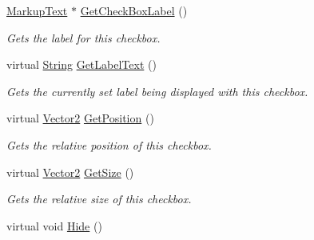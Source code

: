 \begin{DoxyCompactItemize}
\hyperlink{classphys_1_1UI_1_1MarkupText}{MarkupText} $\ast$ \hyperlink{classphys_1_1UI_1_1CheckBox_a5f37379e69ef1259ab48c37a8dc200e9}{GetCheckBoxLabel} ()
\begin{DoxyCompactList}\small\item\em Gets the label for this checkbox. \item\end{DoxyCompactList}\item 
virtual \hyperlink{namespacephys_aa03900411993de7fbfec4789bc1d392e}{String} \hyperlink{classphys_1_1UI_1_1CheckBox_a19078efa52e8b2c133f3b5229b8742eb}{GetLabelText} ()
\begin{DoxyCompactList}\small\item\em Gets the currently set label being displayed with this checkbox. \item\end{DoxyCompactList}\item 
virtual \hyperlink{classphys_1_1Vector2}{Vector2} \hyperlink{classphys_1_1UI_1_1CheckBox_a8a8630b27ab769b6e42657c5388ec7fe}{GetPosition} ()
\begin{DoxyCompactList}\small\item\em Gets the relative position of this checkbox. \item\end{DoxyCompactList}\item 
virtual \hyperlink{classphys_1_1Vector2}{Vector2} \hyperlink{classphys_1_1UI_1_1CheckBox_a99c6ab5087522fbd4825032b9a058585}{GetSize} ()
\begin{DoxyCompactList}\small\item\em Gets the relative size of this checkbox. \item\end{DoxyCompactList}\item 
\hypertarget{classphys_1_1UI_1_1CheckBox_ad58dd6a164e3a3b394899955b612659e}{
virtual void \hyperlink{classphys_1_1UI_1_1CheckBox_ad58dd6a164e3a3b394899955b612659e}{Hide} ()}
\label{classphys_1_1UI_1_1CheckBox_ad58dd6a164e3a3b394899955b612659e}


\end{DoxyCompactItemize}

